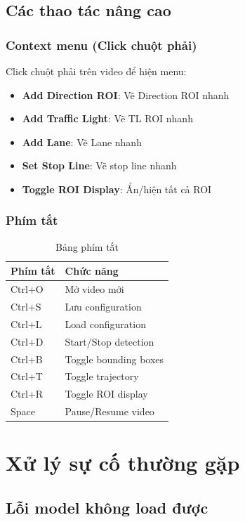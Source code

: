 \subsection{Các thao tác nâng cao}

\subsubsection{Context menu (Click chuột phải)}
Click chuột phải trên video để hiện menu:
\begin{itemize}
    \item \textbf{Add Direction ROI}: Vẽ Direction ROI nhanh
    \item \textbf{Add Traffic Light}: Vẽ TL ROI nhanh
    \item \textbf{Add Lane}: Vẽ Lane nhanh
    \item \textbf{Set Stop Line}: Vẽ stop line nhanh
    \item \textbf{Toggle ROI Display}: Ẩn/hiện tất cả ROI
\end{itemize}

\subsubsection{Phím tắt}
\begin{table}[!ht]
\centering
\caption{Bảng phím tắt}
\label{tab:shortcuts}
\begin{tabular}{|l|l|}
\hline
\textbf{Phím tắt} & \textbf{Chức năng} \\ \hline
Ctrl+O & Mở video mới \\ \hline
Ctrl+S & Lưu configuration \\ \hline
Ctrl+L & Load configuration \\ \hline
Ctrl+D & Start/Stop detection \\ \hline
Ctrl+B & Toggle bounding boxes \\ \hline
Ctrl+T & Toggle trajectory \\ \hline
Ctrl+R & Toggle ROI display \\ \hline
Space & Pause/Resume video \\ \hline
\end{tabular}
\end{table}

\section{Xử lý sự cố thường gặp}

\subsection{Lỗi model không load được}


